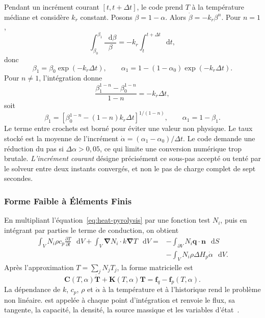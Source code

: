 \documentclass[oneside,openany]{amsdtx}
\newcommand{\dd}{\mathop{}\!\mathrm{d}}
\newcommand{\pd}{\partial}
\newcommand{\vect}[1]{\bm{#1}}
\begin{document}
Pendant un incrément courant \([t,t+\Delta t]\), le code prend \(T\) à la
température médiane et considère \(k_r\) constant. Posons
\(\beta=1-\alpha\). Alors \(\dot\beta=-k_r\beta^n\). Pour \(n=1\),
\begin{equation}
  \int_{\beta_0}^{\beta_1}\frac{\dd\beta}{\beta}
  =-k_r\int_t^{t+\Delta t}\dd t,
\end{equation}
donc
\begin{equation}
  \beta_1=\beta_0\exp(-k_r\Delta t),\qquad
  \boxed{\alpha_1=1-(1-\alpha_0)\exp(-k_r\Delta t).}
  \label{eq:analytic-n1}
\end{equation}
Pour \(n\ne1\), l'intégration donne
\begin{equation}
  \frac{\beta_1^{1-n}-\beta_0^{1-n}}{1-n}=-k_r\Delta t,
\end{equation}
soit
\begin{equation}
  \boxed{\beta_1=
  \left[\beta_0^{1-n}-(1-n)k_r\Delta t\right]^{1/(1-n)},
  \qquad\alpha_1=1-\beta_1.}
  \label{eq:analytic-n}
\end{equation}
Le terme entre crochets est borné pour éviter une valeur non physique. Le taux
stocké est la moyenne de l'incrément
\(\dot\alpha=(\alpha_1-\alpha_0)/\Delta t\). Le code demande une réduction du
pas si \(\Delta\alpha>0{,}05\), ce qui limite une conversion numérique trop
brutale. \emph{L'incrément courant} désigne précisément ce sous-pas accepté ou
tenté par le solveur entre deux instants convergés, et non le pas de charge
complet de sept secondes.

\subsubsection{Forme Faible à Éléments Finis}

En multipliant l'équation~\eqref{eq:heat-pyrolysis} par une fonction test
\(N_i\), puis en intégrant par parties le terme de conduction, on obtient
\begin{align}
  \int_V N_i\rho c_p\frac{\pd T}{\pd t}\,\dd V
  +\int_V \vect\nabla N_i\cdot k\vect\nabla T\,\dd V
  ={}&-\int_{\partial V}N_i\vect q\cdot\vect n\,\dd S \\
  &-\int_V N_i\rho\Delta H_p\dot\alpha\,\dd V.
  \label{eq:weak}
\end{align}
Après l'approximation \(T=\sum_jN_jT_j\), la forme matricielle est
\begin{equation}
  \vect C(T,\alpha)\dot{\vect T}
  +\vect K(T,\alpha)\vect T
  =\vect f_q-\vect f_p(T,\alpha).
\end{equation}
La dépendance de \(k\), \(c_p\), \(\rho\) et \(\dot\alpha\) à la température et
à l'historique rend le problème non linéaire.  est appelée à
chaque point d'intégration et renvoie le flux, sa tangente, la capacité, la
densité, la source massique et les variables d'état~\cite{ansys-usermatth}.
\end{document}
